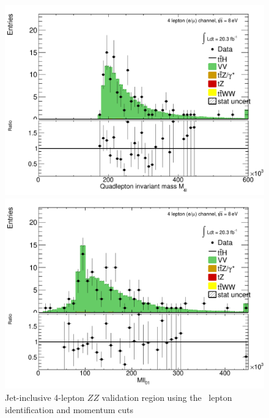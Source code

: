 \begin{figure}[htbp]
\begin{minipage}[h]{0.5\textwidth}
    \centering \includegraphics[width=\textwidth]{figs/WZ/plotCand_4lep_ZZ_CR_Mllll}
  \end{minipage}\hfill
  \begin{minipage}[h]{0.5\textwidth}
    \centering \includegraphics[width=\textwidth]{figs/WZ/plotCand_4lep_ZZ_CR_Mll01}
  \end{minipage}\hfill

  \caption{Jet-inclusive 4-lepton $ZZ$ validation region using the \tth\ lepton identification and momentum cuts }
  \label{figure:background_zz_incl}
\end{figure}


